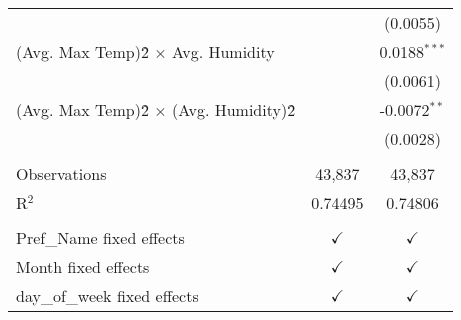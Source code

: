 \begin{table}[htbp]
\begin{tabular}{lcc}
                                                &                 & (0.0055)\\   
      (Avg. Max Temp)\^2 × Avg. Humidity        &                 & 0.0188$^{***}$\\   
                                                &                 & (0.0061)\\   
      (Avg. Max Temp)\^2 × (Avg. Humidity)\^2   &                 & -0.0072$^{**}$\\   
                                                &                 & (0.0028)\\   
       \\
      Observations                              & 43,837          & 43,837\\  
      R$^2$                                     & 0.74495         & 0.74806\\  
       \\
      Pref\_Name fixed effects                  & $\checkmark$    & $\checkmark$\\   
      Month fixed effects                       & $\checkmark$    & $\checkmark$\\   
      day\_of\_week fixed effects               & $\checkmark$    & $\checkmark$\\   
      \bottomrule
   \end{tabular}
\end{table}


